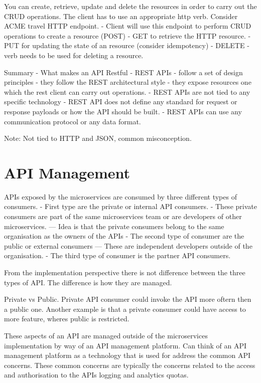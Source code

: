 \documentclass[a4paper, 11pt]{book}
\begin{document}
    You can create, retrieve, update and delete the resources in order to carry out the CRUD operations.
    The client has to use an appropriate http verb.
    Consider ACME travel HTTP endpoint.
    - Client will use this endpoint to perform CRUD operations to create a resource (POST)
    - GET to retrieve the HTTP resource.
    - PUT for updating the state of an resource (consider idempotency)
    - DELETE - verb needs to be used for deleting a resource.

    Summary - What makes an API Restful
    - REST APIs - follow a set of design principles
    - they follow the REST architectural style
    - they expose resources one which the rest client can carry out operations.
    - REST APIs are not tied to any specific technology
    - REST API does not define any standard for request or response payloads or how the API should be built.
    - REST APIs can use any communication protocol or any data format.

    Note: Not tied to HTTP and JSON, common misconception.


    \section{API Management}
    APIs exposed by the microservices are consumed by three different types of consumers.
    - First type are the private or internal API consumers.
    - These private consumers are part of the same microservices team or are developers of other microservices.
    --- Idea is that the private consumers belong to the same organisation as the owners of the APIs
    - The second type of consumer are the public or external consumers
    --- These are independent developers outside of the organisation.
    - The third type of consumer is the partner API consumers.

    From the implementation perspective there is not difference between the three types of API.
    The difference is how they are managed.

    Private vs Public.
    Private API consumer could invoke the API more oftern then a public one.
    Another example is that a private consumer could have access to more feature, wheres public is restricted.

    These aspects of an API are managed outside of the microservices implementation by way of an API management platform.
    Can think of an API management platform as a technology that is used for address the common API concerns.
    These common concerns are typically the concerns related to the access and authorisation to the APIs logging and analytics quotas.
\end{document}
